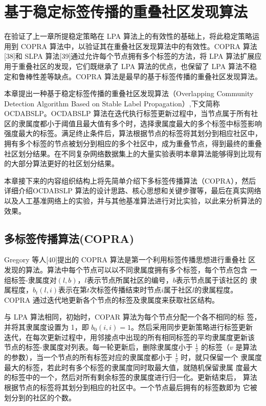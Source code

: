 \chapter{基于稳定标签传播的重叠社区发现算法}
在验证了上一章所提稳定策略在 LPA 算法上的有效性的基础上，将此稳定策略运用到 COPRA 算法中，以验证其在重叠社区发现算法中的有效性。COPRA 算法[38]和 SLPA 算法[39]通过允许每个节点拥有多个标签的方法，将 LPA 算法扩展应用于重叠社区的发现，它们既继承了 LPA 算法的优点，也保留了 LPA 算法不稳定和鲁棒性差等缺点。COPRA 算法是最早的基于标签传播的重叠社区发现算法。

本章提出一种基于稳定标签传播的重叠社区发现算法（Overlapping Community Detection Algorithm Based on Stable Label Propagation）,下文简称 OCDABSLP。OCDABSLP 算法在迭代执行标签更新过程中，当节点属于所有社区的隶属度都小于阈值且最大值有多个时，选择隶属度最大的多个标签中标签影响强度最大的标签。满足终止条件后，算法根据节点的标签将其划分到相应社区中，拥有多个标签的节点被划分到相应的多个社区中，成为重叠节点，得到最终的重叠社区划分结果。在不同复杂网络数据集上的大量实验表明本章算法能够得到比现有的大部分算法更好的社区划分结果。

本章接下来的内容组织结构上将先简单介绍下多标签传播算法（COPRA），然后详细介绍OCDABSLP 算法的设计思路、核心思想和关键步骤等，最后在真实网络以及人工基准网络上的实验，并与其他基准算法进行对比实验，以此来分析算法的效果。

\section{多标签传播算法(COPRA)}

Gregory 等人[40]提出的 COPRA 算法是第一个利用标签传播思想进行重叠社
区发现的算法。算法中每个节点可以以不同隶属度拥有多个标签，每个节点包含
一组标签-隶属度对$(l, b)$，$l $表示节点所属社区的编号，$b $表示节点属于该社区的
隶属程度，$b_t(l, i)$表示在第$ t $次标签传播结束时节点$ i $属于社区$ l $的隶属程度。
COPRA 通过迭代地更新各个节点的标签及隶属度来获取社区结构。

与 LPA 算法相同，初始时，COPAR 算法为每个节点分配一个各不相同的标
签，并将其隶属度设置为 1，即 $b_0(i, i) = 1$。然后采用同步更新策略进行标签更新
迭代，在每次更新过程中，用邻接点中出现的所有相同标签的平均隶属度更新该
节点的标签-隶属度对列表。每一轮更新后，删除隶属度小于 $\frac{1}{v}$ 的标签（$v$ 是算法的参数），当一个节点的所有标签对应的隶属度都小于 $\frac{1}{v}$ 时，就只保留一个
隶属度最大的标签，若此时有多个标签的隶属度同时取最大值，就随机保留隶属
度最大的标签中的一个，然后对所有剩余标签的隶属度进行归一化。更新结束后，
算法根据节点的标签将其划分到相应的社区中。一个节点最后拥有的标签数即为
它被划分到的社区的个数。 

